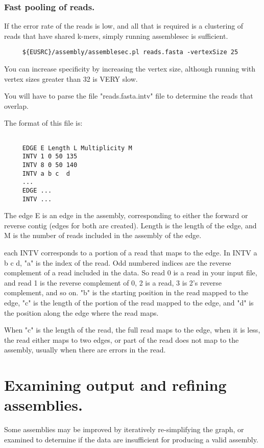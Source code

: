 \documentclass{article}[12pt]
\begin{document}
   \subsubsection{Fast pooling of reads.}

	 If the error rate of the reads is low, and all that is required is
	 a clustering of reads that have shared k-mers, simply running
	 assemblesec is sufficient.

	 
\begin{verbatim}
	 ${EUSRC}/assembly/assemblesec.pl reads.fasta -vertexSize 25
\end{verbatim}

	 You can increase specificity by increasing the vertex size,
	 although running with vertex sizes greater than 32 is VERY slow.

	 You will have to parse the file "reads.fasta.intv" file to
	 determine the reads that overlap.

	 The format of this file is:
\begin{verbatim}

	 EDGE E Length L Multiplicity M
	 INTV 1 0 50 135
	 INTV 8 0 50 140
	 INTV a b c  d
	 ...
	 EDGE ...
	 INTV ...
\end{verbatim}

	 The edge E is an edge in the assembly, corresponding to either the
	 forward or reverse contig (edges for both are created).  Length is
	 the length of the edge, and M is the number of reads included in
	 the assembly of the edge.

	 each INTV corresponds to a portion of a read that maps to the
	 edge.  In INTV a b c d, "a" is the index of the read.  Odd numbered
	 indices are the reverse complement of a read included in the
	 data. So read 0 is a read in your input file, and read 1 is the
	 reverse complement of 0, 2 is a read, 3 is 2's reverse complement,
	 and so on.  "b" is the starting position in the read mapped to the
	 edge, "c" is the length of the portion of the read mapped to the
	 edge, and "d" is the position along the edge where the read maps.

	 When "c" is the length of the read, the full read maps to the
	 edge, when it is less, the read either maps to two edges, or part
	 of the read does not map to the assembly, usually when there are
	 errors in the read.


\section{Examining output and refining assemblies.}
	 Some assemblies may be improved by iteratively re-simplifying the
	 graph, or examined to determine if the data are insufficient for
	 producing a valid assembly.
\end{document}
